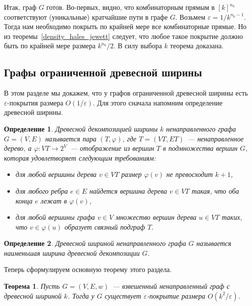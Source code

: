 \documentclass[12pt]{article}
\newcommand{\eps}{\varepsilon}
\newtheorem{definition}{Определение}
\newtheorem{theorem}{Теорема}
\begin{document}
    Итак, граф $G$ готов.
    Во-первых, видно, что комбинаторным прямым в $[k]^{n_0}$ соответствуют (уникальные) кратчайшие пути в графе $G$.
    Возьмем $\varepsilon = 1 / k^{n_0-1}$. Тогда нам необходимо покрыть по крайней мере
    все комбинаторные прямые.
    Но из теоремы~\ref{density_hales_jewett} следует,
    что любое такое покрытие должно быть по крайней мере размера
    $k^{n_0} / 2$. В силу выбора $k$ теорема доказана.

    \subsection{Графы ограниченной древесной ширины}
    \label{subsection_bounded_treewidth}
    В этом разделе мы докажем, что у графов ограниченной древесной ширины есть $\eps$-покрытия размера $O(1 / \eps)$.
    Для этого сначала напомним определение древесной ширины.
    \begin{definition}
        \emph{Древесной декомпозицией ширины $k$} ненаправленного графа $G = (V, E)$ называется пара $(T, \varphi)$,
        где $T = (VT, ET)$~--- ненаправленное дерево, а $\varphi \colon VT \to 2^V$~--- отображение из вершин $T$
        в подмножества вершин $G$, которая удовлетворяет следующим требованиям:
        \begin{itemize}
            \item для любой вершины дерева $v \in VT$ размер $\varphi(v)$ не превосходит $k + 1$, 
            \item для любого ребра $e \in E$ найдется вершина дерева $v \in VT$ такая, что оба конца $e$ лежат в $\varphi(v)$,
            \item для любой вершины графа $v \in V$ множество вершин дерева $u \in VT$ таких, что $v \in \varphi(u)$
            образует связный подграф $T$.
        \end{itemize}
    \end{definition}
    \begin{definition}
        \emph{Древесной шириной} ненаправленного графа $G$ называется наименьшая ширина древесной декомпозиции $G$.
    \end{definition}
    Теперь сформулируем основную теорему этого раздела.
    \begin{theorem}
        \label{bounded_treewidth_eps_nets}
        Пусть $G = (V, E, w)$~--- взвешенный ненаправленный граф с древесной шириной $k$. Тогда у $G$
        существует $\eps$-покрытие размера $O(k^2 / \eps)$.
    \end{theorem}
\end{document}
